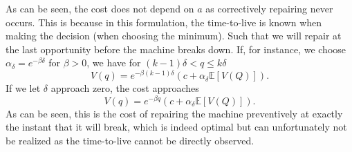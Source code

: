 As can be seen, the cost does not depend on $a$ as correctively repairing never occurs. This is because in this formulation, the time-to-live is known when making the decision (when choosing the minimum). Such that we will repair at the last opportunity before the machine breaks down.
If, for instance, we choose $\alpha_\delta=e^{-\beta \delta}$ for $\beta>0$, we have for $(k-1)\delta<q\leq k\delta$
$$
V(q)=e^{-\beta(k-1)\delta}(c+\alpha_\delta\mathbb{E}[V(Q)]).
$$
If we let $\delta$ approach zero, the cost approaches 
$$
V(q)=e^{-\beta q}(c+\alpha_\delta\mathbb{E}[V(Q)]).
$$
As can be seen, this is the cost of repairing the machine preventively at exactly the instant that it will break, which is indeed optimal but can unfortunately not be realized as the time-to-live cannot be directly observed.